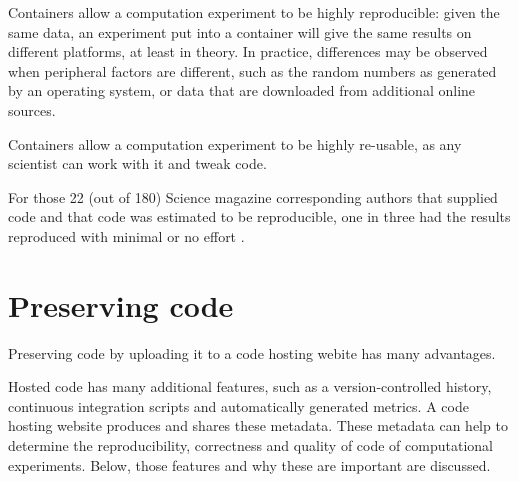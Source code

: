 
Containers allow a computation experiment to be highly reproducible:
given the same data, an experiment put into a container will give
the same results on different platforms, at least in theory.
In practice, differences may be observed when peripheral factors
are different, such as the random numbers as generated by an operating
system, or data that are downloaded from additional online sources.


Containers allow a computation experiment to be highly re-usable,
as any scientist can work with it and tweak code.

For those 22 (out of 180) Science magazine corresponding authors 
that supplied code and that code was estimated to be 
reproducible, one in three had the results reproduced with 
minimal or no effort \cite{stodden2018empirical}.

\section{Preserving code}

Preserving code by uploading it to a code hosting webite
has many advantages.


Hosted code has many additional features, such as
a version-controlled history, continuous integration scripts
and automatically generated metrics.
A code hosting website produces and shares these metadata.
These metadata can help to determine the
reproducibility, correctness and quality of code
of computational experiments.
Below, those features and why these are important are discussed.


